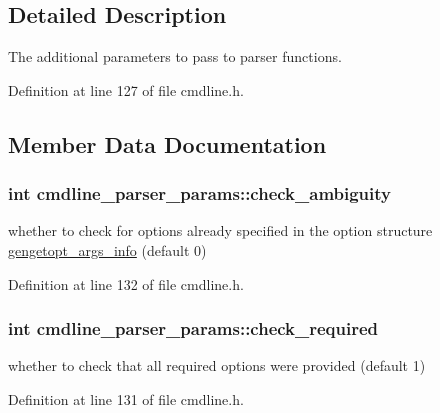 \subsection{Detailed Description}
The additional parameters to pass to parser functions. 

Definition at line 127 of file cmdline.\+h.



\subsection{Member Data Documentation}
\hypertarget{structcmdline__parser__params_a6e4442704fc40b0b655f7cc602f13ec4}{
\subsubsection[{check\+\_\+ambiguity}]{\setlength{\rightskip}{0pt plus 5cm}int cmdline\+\_\+parser\+\_\+params\+::check\+\_\+ambiguity}}\label{structcmdline__parser__params_a6e4442704fc40b0b655f7cc602f13ec4}


whether to check for options already specified in the option structure \hyperlink{structgengetopt__args__info}{gengetopt\+\_\+args\+\_\+info} (default 0) 



Definition at line 132 of file cmdline.\+h.

\hypertarget{structcmdline__parser__params_a44ff439d7e9e36799e59173af74829c6}{
\subsubsection[{check\+\_\+required}]{\setlength{\rightskip}{0pt plus 5cm}int cmdline\+\_\+parser\+\_\+params\+::check\+\_\+required}}\label{structcmdline__parser__params_a44ff439d7e9e36799e59173af74829c6}


whether to check that all required options were provided (default 1) 



Definition at line 131 of file cmdline.\+h.

